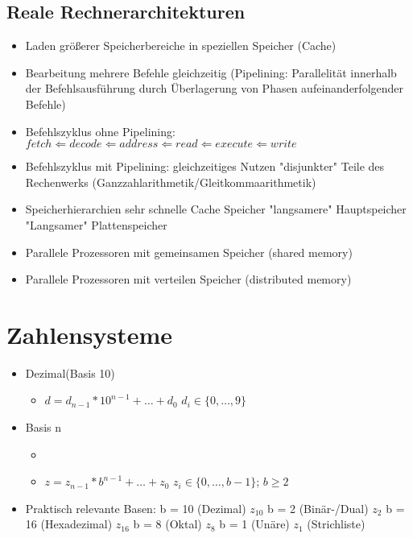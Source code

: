 \documentclass[10pt,a5paper]{article}
\begin{document}
\subsection{Reale Rechnerarchitekturen}
\begin{itemize}
\item Laden größerer Speicherbereiche in speziellen Speicher (Cache)
\item Bearbeitung mehrere Befehle gleichzeitig (Pipelining: Parallelität innerhalb der Befehlsausführung durch Überlagerung von Phasen aufeinanderfolgender Befehle)
\item Befehlszyklus ohne Pipelining:
\subitem \ensuremath{fetch\Leftarrow decode\Leftarrow address\Leftarrow read\Leftarrow execute \Leftarrow write}
\item Befehlszyklus mit Pipelining:
\subitem gleichzeitiges Nutzen "disjunkter" Teile des Rechenwerks (Ganzzahlarithmetik/Gleitkommaarithmetik)
\item Speicherhierarchien
\subitem sehr schnelle Cache Speicher
\subitem "langsamere" Hauptspeicher
\subitem "Langsamer" Plattenspeicher
\item Parallele Prozessoren mit gemeinsamen Speicher (shared memory)
\item Parallele Prozessoren mit verteilen Speicher (distributed memory)
\end{itemize}
\section{Zahlensysteme}
\begin{itemize}
\item Dezimal(Basis 10)\begin{itemize}
\item \ensuremath{d=d_{n-1}*10^{n-1}+\dots+d_0}
\subitem \ensuremath{d_i\in \{0,\dots,9\}}
\end{itemize}
\item Basis n \begin{itemize}
\item \item \ensuremath{z=z_{n-1}*b^{n-1}+\dots+z_0}
\subitem \ensuremath{z_i\in \{0,\dots,b-1\}}; \ensuremath{b\ge 2}
\end{itemize}
\item Praktisch relevante Basen:
\subitem b = 10 (Dezimal) \ensuremath{z_{10}}
\subitem b = 2  (Binär-/Dual) \ensuremath{z_2}
\subitem b = 16 (Hexadezimal) \ensuremath{z_{16}}
\subitem b = 8 (Oktal) \ensuremath{z_8}
\subitem b = 1 (Unäre) \ensuremath{z_1} (Strichliste)
\end{itemize}
\end{document}
